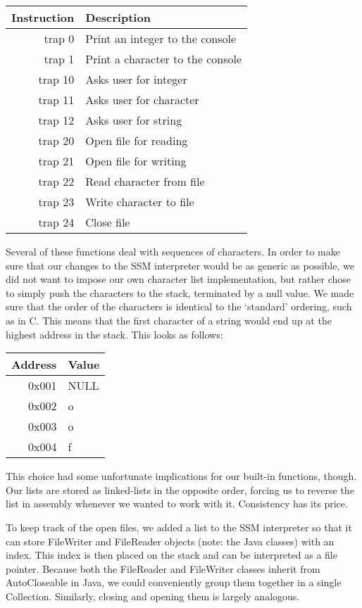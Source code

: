 \documentclass[a4paper]{article}
\begin{document}
\begin{center}
\begin{tabular}{r | l}
Instruction & Description \\
\hline
trap 0 & Print an integer to the console \\
trap 1 & Print a character to the console \\
trap 10 & Asks user for integer \\
trap 11 & Asks user for character \\
trap 12 & Asks user for string  \\
trap 20 & Open file for reading  \\
trap 21 & Open file for writing \\
trap 22 & Read character from file \\
trap 23 & Write character to file \\
trap 24 & Close file
\end{tabular}
\end{center}

Several of these functions deal with sequences of characters. In order to make sure that our changes to the SSM interpreter would be as generic as possible, we did not want to impose our own character list implementation, but rather chose to simply push the characters to the stack, terminated by a null value. We made sure that the order of the characters is identical to the `standard' ordering, such as in C. This means that the first character of a string would end up at the highest address in the stack. This looks as follows:
\begin{center}
\begin{tabular}{|r|l|}
\hline
Address & Value \\
\hline
0x001 & NULL \\
\hline
0x002 & o \\
\hline
0x003 & o \\
\hline
0x004 & f \\
\hline
\end{tabular}
\end{center}

This choice had some unfortunate implications for our built-in functions, though. Our lists are stored as linked-lists in the opposite order, forcing us to reverse the list in assembly whenever we wanted to work with it. Consistency has its price.

To keep track of the open files, we added a list to the SSM interpreter so that it can store FileWriter and FileReader objects (note: the Java classes) with an index. This index is then placed on the stack and can be interpreted as a file pointer. Because both the FileReader and FileWriter classes inherit from AutoCloseable in Java, we could conveniently group them together in a single Collection. Similarly, closing and opening them is largely analogous.
\end{document}
